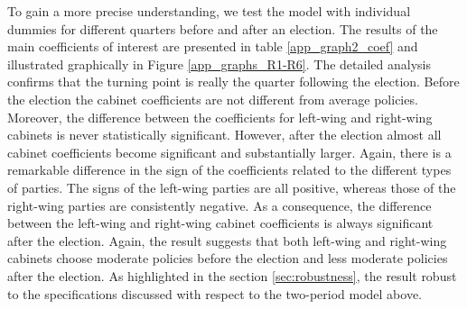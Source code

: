 \documentclass[a4paper,12pt]{article}
\begin{document}
To gain a more precise understanding, we test the model with individual dummies for different quarters before and after an election. The results of the main coefficients of interest are presented in table \ref{app_graph2_coef} and illustrated graphically in Figure \ref{app_graphs_R1-R6}. The detailed analysis confirms that the turning point is really the quarter following the election. Before the election the cabinet coefficients are not different from average policies. Moreover, the difference between the coefficients for left-wing and right-wing cabinets is never statistically significant. However, after the election almost all cabinet coefficients become significant and substantially larger. Again, there is a remarkable difference in the sign of the coefficients related to the different types of parties. The signs of the left-wing parties are all positive, whereas those of the right-wing parties are consistently negative. As a consequence, the difference between the left-wing and right-wing cabinet coefficients is always significant after the election. Again, the result suggests that both left-wing and right-wing cabinets choose moderate policies before the election and less moderate policies after the election. As highlighted in the section \ref{sec:robustness}, the result robust to the specifications discussed with respect to the two-period model above. 


 
\end{document}
